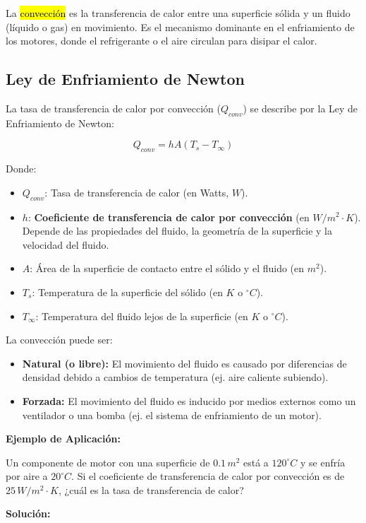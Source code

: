\documentclass{article}
\begin{document}
La \hl{convección} es la transferencia de calor entre una superficie sólida y un fluido (líquido o gas) en movimiento. Es el mecanismo dominante en el enfriamiento de los motores, donde el refrigerante o el aire circulan para disipar el calor.

\subsection*{Ley de Enfriamiento de Newton}

La tasa de transferencia de calor por convección ($Q_{conv}$) se describe por la Ley de Enfriamiento de Newton:

$$ Q_{conv} = h A (T_s - T_\infty) $$

Donde:
\begin{itemize}
    \item $Q_{conv}$: Tasa de transferencia de calor (en Watts, $W$).
    \item $h$: \textbf{Coeficiente de transferencia de calor por convección} (en $W/m^2 \cdot K$). Depende de las propiedades del fluido, la geometría de la superficie y la velocidad del fluido.
    \item $A$: Área de la superficie de contacto entre el sólido y el fluido (en $m^2$).
    \item $T_s$: Temperatura de la superficie del sólido (en $K$ o $^\circ C$).
    \item $T_\infty$: Temperatura del fluido lejos de la superficie (en $K$ o $^\circ C$).
\end{itemize}

La convección puede ser:
\begin{itemize}
    \item \textbf{Natural (o libre):} El movimiento del fluido es causado por diferencias de densidad debido a cambios de temperatura (ej. aire caliente subiendo).
    \item \textbf{Forzada:} El movimiento del fluido es inducido por medios externos como un ventilador o una bomba (ej. el sistema de enfriamiento de un motor).
\end{itemize}

\textbf{Ejemplo de Aplicación:}

Un componente de motor con una superficie de $0.1 \, m^2$ está a $120^\circ C$ y se enfría por aire a $20^\circ C$. Si el coeficiente de transferencia de calor por convección es de $25 \, W/m^2 \cdot K$, ¿cuál es la tasa de transferencia de calor?

\textbf{Solución:}
\end{document}
